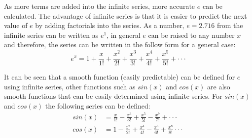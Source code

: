 As more terms are added into the infinite series, more accurate $e$ can be calculated. The advantage of infinite series is that it is easier to predict the next value of $e$ by adding factorials into the series. As a number, $e = 2.716$ from the infinite series can be written as $e^{1}$, in general $e$ can be raised to any number $x$ and therefore, the series can be written in the follow form for a general case:
\begin{equation}
	e^{x} = 1 + \frac{x}{1!} + \frac{x^{2}}{2!} +  \frac{x^{3}}{3!} + \frac{x^{4}}{4!} + \frac{x^{5}}{5!} + \cdot \cdot \cdot
\end{equation}

It can be seen that a smooth function (easily predictable) can be defined for $e$ using infinite series, other functions such as $sin(x)$ and $cos(x)$ are also smooth functions that can be easily determined using infinite series. For $sin(x)$ and $cos(x)$ the following series can be defined:
\begin{align}
	sin(x) &= \frac{x}{1!} - \frac{x^3}{3!} + \frac{x^5}{5!} - \frac{x^7}{7!} + \cdot \cdot \cdot \label{Eq_Prelims_sinx} \\ 
	cos(x) &= 1 - \frac{x^2}{2!} + \frac{x^4}{4!} - \frac{x^6}{6!} + \frac{x^8}{8!} \cdot \cdot \cdot \label{Eq_Prelims_cosx}
\end{align}

